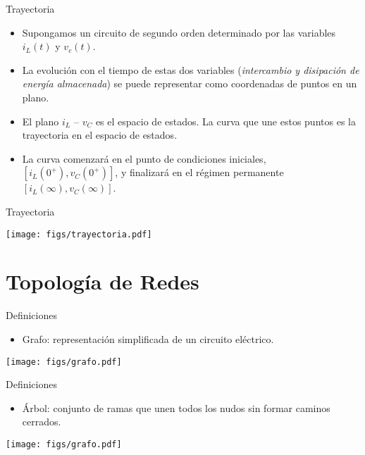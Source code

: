 \documentclass[xcolor={usenames,svgnames,dvipsnames}]{beamer}
\begin{document}
\begin{frame}[label={sec:org5815dda}]{Trayectoria}
\begin{itemize}
\item Supongamos un circuito de segundo orden determinado por las variables \(i_L(t)\) y \(v_c(t)\).
\item La \alert{evolución con el tiempo} de estas dos variables (\emph{intercambio y disipación de energía almacenada}) se puede representar como \alert{coordenadas de puntos en un plano}.
\item El plano \(i_L\) -- \(v_C\) es el \alert{espacio de estados}. La curva que une estos puntos es la \alert{trayectoria en el espacio de estados}.
\item La curva comenzará en el punto de condiciones iniciales, \([i_L(0^+), v_C(0^+)]\), y finalizará en el régimen permanente \([i_L(\infty), v_C(\infty)]\).
\end{itemize}
\end{frame}

\begin{frame}[label={sec:org3944265}]{Trayectoria}
\begin{center}
\texttt{[image: figs/trayectoria.pdf]}
\end{center}
\end{frame}

\section{Topología de Redes}
\label{sec:orge3732b2}

\begin{frame}[label={sec:org4daf473}]{Definiciones}
\begin{itemize}
\item \alert{Grafo}: representación simplificada de un circuito eléctrico.
\end{itemize}

\begin{center}
\texttt{[image: figs/grafo.pdf]}
\end{center}
\end{frame}

\begin{frame}[label={sec:org59955f3}]{Definiciones}
\begin{itemize}
\item \alert{Árbol}: conjunto de ramas que unen todos los nudos sin formar caminos cerrados.
\end{itemize}

\begin{center}
\texttt{[image: figs/grafo.pdf]}
\end{center}
\end{frame}
\end{document}
